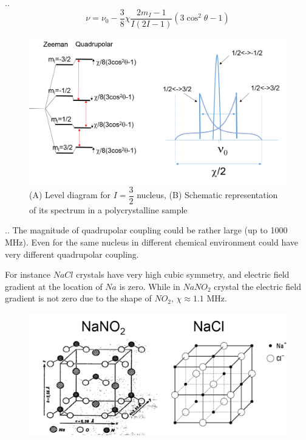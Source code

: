 \documentclass[handout]{beamer}
\begin{document}
\begin{frame}{\thesection.\thesubsection. \insertsubsection}
    	\begin{equation}
    	\nu = \nu_0 -\dfrac{3}{8} \chi \dfrac{2 m_I -1}{I(2I -1)}(3 \cos^2 \theta - 1)
    	\end{equation}
    	
    	\begin{figure}
    		\centering
    		\includegraphics[scale=0.4]{Quadrupole2.png}
    		\caption{(A) Level diagram for $I=\dfrac{3}{2}$ nucleus, (B) Schematic representation of its spectrum in a polycrystalline sample}
    	\end{figure}
\end{frame}

\begin{frame}{\thesection.\thesubsection. \insertsubsection}
	The magnitude of quadrupolar coupling could be rather large (up to 1000 MHz). Even for the same nucleus in different chemical environment could have very different quadrupolar coupling.
	
	For instance $NaCl$ crystals have very high cubic symmetry, and electric field gradient at the location of $Na$ is zero. While in $NaNO_2$ crystal the electric field gradient is not zero due to the shape of $NO_2$, $\chi \approx 1.1$ MHz.
	\begin{figure}
      \centering
      \includegraphics[scale=0.5]{Quadrupole3.png}
	\end{figure}
	
\end{frame}
\end{document}

